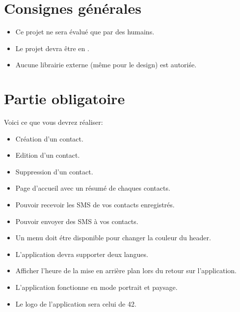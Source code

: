 \documentclass{42}
\begin{document}
\chapter{Consignes g\'en\'erales}

	\begin{itemize}\itemsep6pt
		\item Ce projet ne sera évalué que par des humains.
		\item Le projet devra \^etre en \@JAVA.
		\item Aucune librairie externe (m\^eme pour le design) est autori\'se.
	\end{itemize}


\chapter{Partie obligatoire}
	
	Voici ce que vous devrez r\'ealiser:\\
	\vspace{5mm}
	\begin{itemize}\itemsep6pt
		\item Cr\'eation d'un contact.
		\item Edition d'un contact.
		\item Suppression d'un contact.
		\item Page d'accueil avec un r\'esum\'e de chaques contacts.
		\item Pouvoir recevoir les SMS de vos contacts enregistr\'es.
		\item Pouvoir envoyer des SMS \`a vos contacts.
		\item Un menu doit \'etre disponible pour changer la couleur du header.
		\item L'application devra supporter deux langues.
		\item Afficher l'heure de la mise en arri\`ere plan lors du retour sur
		l'application.
		\item L'application fonctionne en mode portrait et paysage.
		\item Le logo de l'application sera celui de 42.
	\end{itemize}
\end{document}
